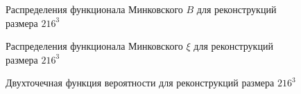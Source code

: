 			\begin{figure}[h]
				\begin{minipage}[h]{0.49\linewidth}
				\end{minipage}
				\hfill
				\begin{minipage}[h]{0.49\linewidth}
				\end{minipage}
				\caption{Распределения функционала Минковского $B$ для реконструкций размера $216^3$}
				\label{5-dist-B-216}
			\end{figure}
			
			\begin{figure}[h]
				\begin{minipage}[h]{0.49\linewidth}
				\end{minipage}
				\hfill
				\begin{minipage}[h]{0.49\linewidth}
				\end{minipage}
				\caption{Распределения функционала Минковского $\xi$ для реконструкций размера $216^3$}
				\label{5-dist-Xi-216}
			\end{figure}
		
			\begin{figure}[h]
				\begin{minipage}[h]{0.49\linewidth}
				\end{minipage}
				\hfill
				\begin{minipage}[h]{0.49\linewidth}
				\end{minipage}
				\caption{Двухточечная функция вероятности для реконструкций размера $216^3$}
				\label{5-prob-216}
			\end{figure}
			
